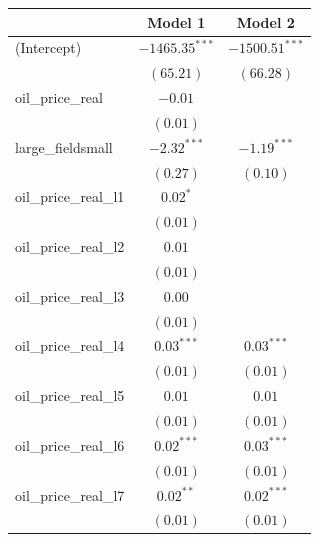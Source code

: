 \documentclass[12pt]{article}
\begin{document}
\begin{table}
\begin{center}
\begin{tabular}{l c c }
\hline
                                     & Model 1 & Model 2 \\
\hline
(Intercept)                          & $-1465.35^{***}$ & $-1500.51^{***}$ \\
                                     & $(65.21)$        & $(66.28)$        \\
oil_price_real                       & $-0.01$          &                  \\
                                     & $(0.01)$         &                  \\
large_fieldsmall                     & $-2.32^{***}$    & $-1.19^{***}$    \\
                                     & $(0.27)$         & $(0.10)$         \\
oil_price_real_l1                    & $0.02^{*}$       &                  \\
                                     & $(0.01)$         &                  \\
oil_price_real_l2                    & $0.01$           &                  \\
                                     & $(0.01)$         &                  \\
oil_price_real_l3                    & $0.00$           &                  \\
                                     & $(0.01)$         &                  \\
oil_price_real_l4                    & $0.03^{***}$     & $0.03^{***}$     \\
                                     & $(0.01)$         & $(0.01)$         \\
oil_price_real_l5                    & $0.01$           & $0.01$           \\
                                     & $(0.01)$         & $(0.01)$         \\
oil_price_real_l6                    & $0.02^{***}$     & $0.03^{***}$     \\
                                     & $(0.01)$         & $(0.01)$         \\
oil_price_real_l7                    & $0.02^{**}$      & $0.02^{***}$     \\
                                     & $(0.01)$         & $(0.01)$         \\

\end{tabular}
\end{center}
\end{table}
\end{document}

